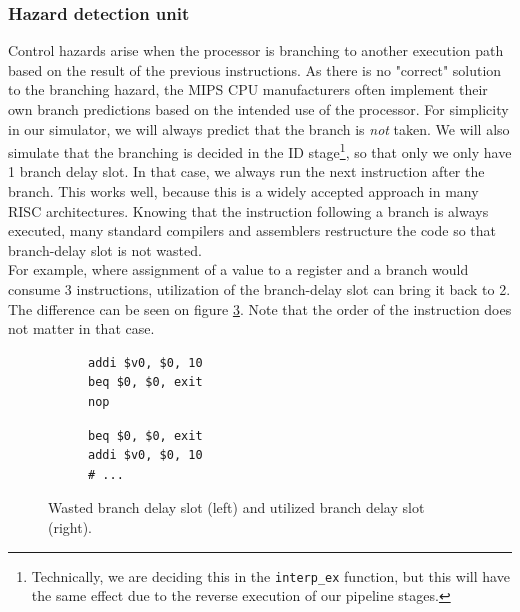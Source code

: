\subsubsection{Hazard detection unit}
Control hazards arise when the processor is branching to another execution path
based on the result of the previous instructions. As there is no "correct"
solution to the branching hazard, the MIPS CPU manufacturers often implement
their own branch predictions based on the intended use of the processor. For
simplicity in our simulator, we will always predict that the branch is
\textit{not} taken. We will also simulate that the branching is decided in the
ID stage\footnote{Technically, we are deciding this in the \texttt{interp\_ex} function,
but this will have the same effect due to the reverse execution of our pipeline stages.}, so that only we only have 1 branch delay slot.
In that case, we always run the next instruction after the
branch. This works well, because this is a widely accepted approach in many
RISC architectures\cite{wiki:branch_delay_slots}.  Knowing that the instruction
following a branch is always executed, many standard compilers and assemblers
restructure the code so that branch-delay slot is not wasted.\\
For example, where assignment of a value to a register and a branch would
consume 3 instructions, utilization of the branch-delay slot can bring it back
to 2. The difference can be seen on figure \ref{fig:branch_delay_slot_compare}.
Note that the order of the instruction does not matter in that case.
\begin{figure}[H]
    \centering
    \begin{subfigure}[t]{0.23\textwidth}
    \begin{lstlisting}[numbers=none]
addi $v0, $0, 10
beq $0, $0, exit
nop
    \end{lstlisting}
    \label{fig:non_utilized_branch_delay}

   \end{subfigure}
    \begin{subfigure}[t]{0.23\textwidth}
     \begin{lstlisting}[numbers=none]
beq $0, $0, exit
addi $v0, $0, 10
# ...
   \end{lstlisting}
        \label{fig:utilized_branch_delay}
    \end{subfigure}
\caption{Wasted branch delay slot (left) and utilized branch delay slot (right).}
\label{fig:branch_delay_slot_compare}
\end{figure}



